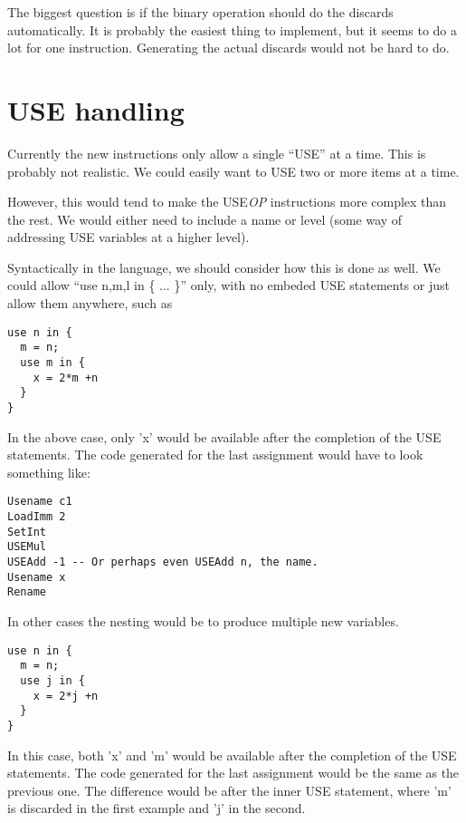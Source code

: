 \documentclass[12pt]{article}
\begin{document}
The biggest question is if the binary operation should do the 
discards automatically. It is probably the easiest thing to implement, but
it seems to do a lot for one instruction. Generating the actual 
discards would not be hard to do.
\section{USE handling}\label{sec:usehandling}
Currently the new instructions only allow a single ``USE'' at a time.
This is probably not realistic. We could easily want to USE two or more
items at a time.

However, this would tend to make the USE\emph{OP} instructions more 
complex than the rest. We would either need to include a name or 
level (some way of addressing USE variables at a higher level). 

Syntactically in the language, we should consider how this is done as well.
We could allow ``use n,m,l in \{ ... \}'' only, with no embeded USE statements
or just allow them anywhere, such as 
\begin{verbatim}
use n in {
  m = n;
  use m in {
    x = 2*m +n
  }
}
\end{verbatim}
In the above case, only 'x' would be available after the completion of the 
USE statements. The code generated for the last assignment would have to
look something like:
\begin{verbatim}
Usename c1
LoadImm 2
SetInt
USEMul 
USEAdd -1 -- Or perhaps even USEAdd n, the name.
Usename x
Rename
\end{verbatim}
In other cases the nesting would be to produce multiple new variables.
\begin{verbatim}
use n in {
  m = n;
  use j in {
    x = 2*j +n
  }
}
\end{verbatim}
In this case, both  'x' and 'm' would be available after the completion of the 
USE statements. The code generated for the last assignment would be the same
as the previous one. The difference would be after the inner USE statement, 
where 'm' is discarded in the first example and 'j' in the second.
\end{document}
